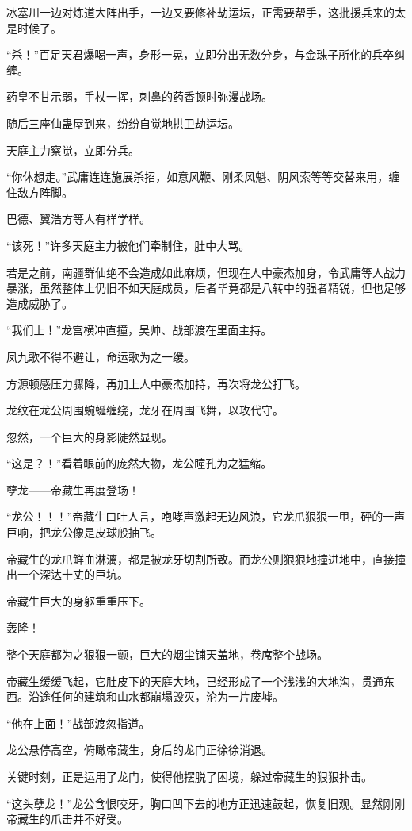 \begin{this_body}
冰塞川一边对炼道大阵出手，一边又要修补劫运坛，正需要帮手，这批援兵来的太是时候了。

“杀！”百足天君爆喝一声，身形一晃，立即分出无数分身，与金珠子所化的兵卒纠缠。

药皇不甘示弱，手杖一挥，刺鼻的药香顿时弥漫战场。

随后三座仙蛊屋到来，纷纷自觉地拱卫劫运坛。

天庭主力察觉，立即分兵。

“你休想走。”武庸连连施展杀招，如意风鞭、刚柔风魁、阴风索等等交替来用，缠住敌方阵脚。

巴德、翼浩方等人有样学样。

“该死！”许多天庭主力被他们牵制住，肚中大骂。

若是之前，南疆群仙绝不会造成如此麻烦，但现在人中豪杰加身，令武庸等人战力暴涨，虽然整体上仍旧不如天庭成员，后者毕竟都是八转中的强者精锐，但也足够造成威胁了。

“我们上！”龙宫横冲直撞，吴帅、战部渡在里面主持。

凤九歌不得不避让，命运歌为之一缓。

方源顿感压力骤降，再加上人中豪杰加持，再次将龙公打飞。

龙纹在龙公周围蜿蜒缠绕，龙牙在周围飞舞，以攻代守。

忽然，一个巨大的身影陡然显现。

“这是？！”看着眼前的庞然大物，龙公瞳孔为之猛缩。

孽龙——帝藏生再度登场！

“龙公！！！”帝藏生口吐人言，咆哮声激起无边风浪，它龙爪狠狠一甩，砰的一声巨响，把龙公像是皮球般抽飞。

帝藏生的龙爪鲜血淋漓，都是被龙牙切割所致。而龙公则狠狠地撞进地中，直接撞出一个深达十丈的巨坑。

帝藏生巨大的身躯重重压下。

轰隆！

整个天庭都为之狠狠一颤，巨大的烟尘铺天盖地，卷席整个战场。

帝藏生缓缓飞起，它肚皮下的天庭大地，已经形成了一个浅浅的大地沟，贯通东西。沿途任何的建筑和山水都崩塌毁灭，沦为一片废墟。

“他在上面！”战部渡忽指道。

龙公悬停高空，俯瞰帝藏生，身后的龙门正徐徐消退。

关键时刻，正是运用了龙门，使得他摆脱了困境，躲过帝藏生的狠狠扑击。

“这头孽龙！”龙公含恨咬牙，胸口凹下去的地方正迅速鼓起，恢复旧观。显然刚刚帝藏生的爪击并不好受。


\end{this_body}
